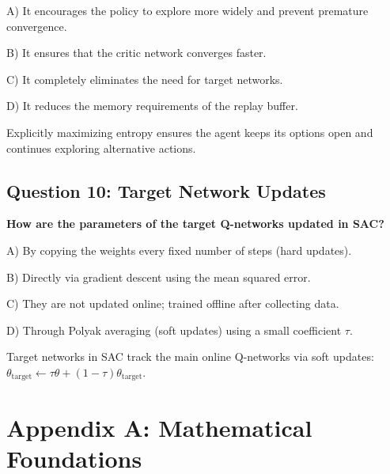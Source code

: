 \documentclass[12pt,a4paper]{article}
\theoremstyle{noteplain}
\theoremstyle{noteexercise}
\begin{document}
A) It encourages the policy to explore more widely and prevent premature convergence.

B) It ensures that the critic network converges faster.

C) It completely eliminates the need for target networks.

D) It reduces the memory requirements of the replay buffer.

\begin{keypoint}[Answer: A]

Explicitly maximizing entropy ensures the agent keeps its options open and continues exploring alternative actions.

\end{keypoint}



\subsection{Question 10: Target Network Updates}\label{ssec:q10}



\textbf{How are the parameters of the target Q-networks updated in SAC?}

A) By copying the weights every fixed number of steps (hard updates).

B) Directly via gradient descent using the mean squared error.

C) They are not updated online; trained offline after collecting data.

D) Through Polyak averaging (soft updates) using a small coefficient $\tau$.

\begin{keypoint}[Answer: D]

Target networks in SAC track the main online Q-networks via soft updates: $\theta_{\text{target}} \leftarrow \tau \theta + (1-\tau)\theta_{\text{target}}$.

\end{keypoint}






\appendix

\section{Appendix A: Mathematical Foundations}\label{sec:appendix-a}
\end{document}
